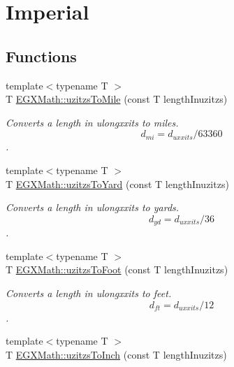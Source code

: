 \hypertarget{group___e_g_x_math-_conversions-_length_conversions-uzitzs-_imperial}{}\section{Imperial}
\label{group___e_g_x_math-_conversions-_length_conversions-uzitzs-_imperial}
\subsection*{Functions}
\begin{DoxyCompactItemize}
\item 
{\footnotesize template$<$typename T $>$ }\\T \mbox{\hyperlink{group___e_g_x_math-_conversions-_length_conversions-uzitzs-_imperial_ga3396c913e6937eee49337db8fac05ca7}{E\+G\+X\+Math\+::uzitzs\+To\+Mile}} (const T length\+Inuzitzs)
\begin{DoxyCompactList}\small\item\em Converts a length in ulongxxits to miles. \[ d_{mi}=d_{uxxits} / 63360 \]. \end{DoxyCompactList}\item 
{\footnotesize template$<$typename T $>$ }\\T \mbox{\hyperlink{group___e_g_x_math-_conversions-_length_conversions-uzitzs-_imperial_ga3281bb64c81bc68a166a47ccc1f9a146}{E\+G\+X\+Math\+::uzitzs\+To\+Yard}} (const T length\+Inuzitzs)
\begin{DoxyCompactList}\small\item\em Converts a length in ulongxxits to yards. \[ d_{yd}=d_{uxxits} / 36 \]. \end{DoxyCompactList}\item 
{\footnotesize template$<$typename T $>$ }\\T \mbox{\hyperlink{group___e_g_x_math-_conversions-_length_conversions-uzitzs-_imperial_gaafdc16c327535a3ea42909a5ebadac71}{E\+G\+X\+Math\+::uzitzs\+To\+Foot}} (const T length\+Inuzitzs)
\begin{DoxyCompactList}\small\item\em Converts a length in ulongxxits to feet. \[ d_{ft}=d_{uxxits} / 12 \]. \end{DoxyCompactList}\item 
{\footnotesize template$<$typename T $>$ }\\T \mbox{\hyperlink{group___e_g_x_math-_conversions-_length_conversions-uzitzs-_imperial_gad471f5c0b894eb0f2850a19347306ed4}{E\+G\+X\+Math\+::uzitzs\+To\+Inch}} (const T length\+Inuzitzs)

\end{DoxyCompactItemize}
